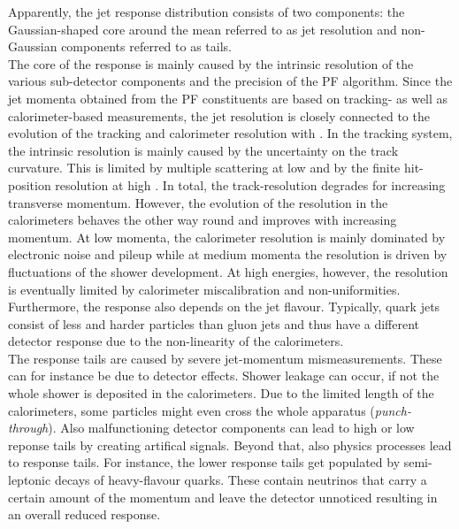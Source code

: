 Apparently, the jet response distribution consists of two components: the Gaussian-shaped core around the mean referred to as jet resolution and non-Gaussian components referred to as tails. \\
The core of the response is mainly caused by the intrinsic resolution of the various sub-detector components and the precision of the PF algorithm. Since the jet momenta obtained from the PF constituents are based on tracking- as well as calorimeter-based measurements, the jet resolution is closely connected to the evolution of the tracking and calorimeter resolution with \pt. In the tracking system, the intrinsic resolution is mainly caused by the uncertainty on the track curvature. This is limited by multiple scattering at low \pt and by the finite hit-position resolution at high \pt. In total, the track-\pt resolution degrades for increasing transverse momentum. However, the evolution of the resolution in the calorimeters behaves the other way round and improves with increasing momentum. At low momenta, the calorimeter resolution is mainly dominated by electronic noise and pileup while at medium momenta the resolution is driven by fluctuations of the shower development. At high energies, however, the resolution is eventually limited by calorimeter miscalibration and non-uniformities. Furthermore, the response also depends on the jet flavour. Typically, quark jets consist of less and harder particles than gluon jets and thus have a different detector response due to the non-linearity of the calorimeters.  \\
The response tails are caused by severe jet-momentum mismeasurements. These can for instance be due to detector effects. Shower leakage can occur, if not the whole shower is deposited in the calorimeters. Due to the limited length of the calorimeters, some particles might even cross the whole apparatus (\textit{punch-through}). Also malfunctioning detector components can lead to high or low reponse tails by creating artifical signals. Beyond that, also physics processes lead to response tails. For instance, the lower response tails get populated by semi-leptonic decays of heavy-flavour quarks. These contain neutrinos that carry a certain amount of the momentum and leave the detector unnoticed resulting in an overall reduced response. 


